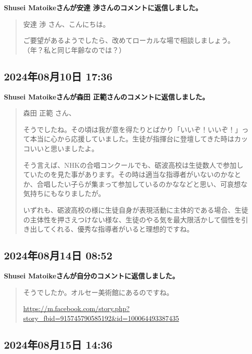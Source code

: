 \textbf{Shusei Matoikeさんが安達 渉さんのコメントに返信しました。}

\begin{quote}
安達 渉 さん、こんにちは。

ご要望があるようでしたら、改めてローカルな場で相談しましょう。（年？私と同じ年齢なのでは？）
\end{quote}

\subsection*{2024年08月10日 17:36}

\textbf{Shusei Matoikeさんが森田 正範さんのコメントに返信しました。}

\begin{quote}
森田 正範 さん、

そうでしたね。その頃は我が意を得たりとばかり「いいぞ！いいぞ！」って本当に心から応援していました。生徒が指揮台に登壇してきた時はカッコいいと思いましたよ。

そう言えば、NHKの合唱コンクールでも、砺波高校は生徒数人で参加していたのを見た事があります。その時は適当な指導者がいないのかなとか、合唱したい子らが集まって参加しているのかななどと思い、可哀想な気持ちにもなりましたが。

いずれも、砺波高校の様に生徒自身が表現活動に主体的である場合、生徒の主体性を押さえつけない様な、生徒のやる気を最大限活かして個性を引き出してくれる、優秀な指導者がいると理想的ですね。
\end{quote}

\subsection*{2024年08月14日 08:52}

\textbf{Shusei Matoikeさんが自分のコメントに返信しました。}

\begin{quote}
そうでしたか。オルセー美術館にあるのですね。

\url{https://m.facebook.com/story.php?story_fbid=915745790585192&id=100064493387435}
\end{quote}

\subsection*{2024年08月15日 14:36}

